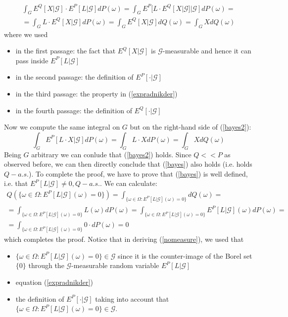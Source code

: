 \documentclass[a4paper,10pt]{report}
\theoremstyle{plain}
\theoremstyle{definition}
\newcommand\be{\begin{eqnarray}}    %
\newcommand\ee{\end{eqnarray}}
\newcommand{\GG} {\mathcal{G} }
\newcommand{\DPO} {dP(\omega) }
\begin{document}
\be
\int_G E^Q[X|\GG]\cdot E^P[L|\GG] \DPO=\int_G  E^P[L\cdot E^Q[X|\GG]|\GG] \DPO=\\
=\int_G  L\cdot E^Q[X|\GG] \DPO=\int_G  E^Q[X|\GG] dQ(\omega)=\int_G  X dQ(\omega)
\ee
where we used
\begin{itemize}
\item in the first passage: the fact that $E^Q[X|\GG]$ is $\GG$-measurable and hence it can pass inside $E^P[L|\GG]$
\item in the second passage: the definition of $E^P[\cdot|\GG]$
\item in the third passage: the property in (\ref{expradnikder})
\item in the fourth passage: the definition of $E^Q[\cdot|\GG]$
\end{itemize}
Now we compute the same integral on $G$ but on the right-hand side of (\ref{bayes2}):
\[
\int_G E^P[L\cdot X|\GG] \DPO=\int_G L\cdot X \DPO=\int_G  X dQ(\omega)
\]
Being $G$ arbitrary we can conlude that (\ref{bayes2}) holds. Since $Q<<P$ as observed before, we can then directly conclude that (\ref{bayes}) also holds (i.e. holds $Q-a.s.$).
To complete the proof, we have to prove that (\ref{bayes}) is well defined, i.e. that $E^P[L|\GG]\neq 0, Q-a.s.$.
We can calculate:
\be
Q\left(\{\omega\in\Omega: E^P[L|\GG](\omega)=0\}\right)=\int_{\{\omega\in\Omega: E^P[L|\GG](\omega)=0\}}dQ(\omega)=\\
=\int_{\{\omega\in\Omega: E^P[L|\GG](\omega)=0\}}L(\omega)\DPO=\int_{\{\omega\in\Omega: E^P[L|\GG](\omega)=0\}}E^P[L|\GG](\omega)\DPO=\\
=\int_{\{\omega\in\Omega: E^P[L|\GG](\omega)=0\}}0\cdot \DPO=0
\label{nomeasure}
\ee
which completes the proof.
Notice that in deriving (\ref{nomeasure}), we used that
\begin{itemize}
\item $\{\omega\in\Omega: E^P[L|\GG](\omega)=0\} \in \GG$ since it is the counter-image of the Borel set $\{0\}$ through the $\GG$-measurable random variable $E^P[L|\GG]$
\item equation (\ref{expradnikder})
\item the definition of $E^P[\cdot|\GG]$ taking into account that $\{\omega\in\Omega: E^P[L|\GG](\omega)=0\} \in \GG$.
\end{itemize} 
\end{document}
